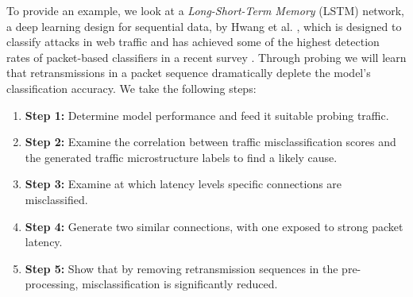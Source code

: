 \documentclass[runningheads]{llncs}
\begin{document}
To provide an example, we look at a \textit{Long-Short-Term Memory} (LSTM) network, a deep learning design for sequential data, by Hwang et al. \cite{hwang2019lstm}, which is designed to classify attacks in web traffic and has achieved some of the highest detection rates of packet-based classifiers in a recent survey \cite{tahaei2020rise}. Through probing we will learn that retransmissions in a packet sequence dramatically deplete the model's classification accuracy. We take the following steps:

\begin{enumerate}
\item [] \textbf{Step 1:} Determine model performance and feed it suitable probing traffic.
\item [] \textbf{Step 2:} Examine the correlation between traffic misclassification scores and the generated traffic microstructure labels to find a likely cause.%
\item [] \textbf{Step 3:} Examine at which latency levels specific connections are misclassified.

\item [] \textbf{Step 4:} Generate two similar connections, with one exposed to strong packet latency.%
\item [] \textbf{Step 5:} Show that by removing retransmission sequences in the pre-processing, misclassification is significantly reduced.
\end{enumerate}







\end{document}
